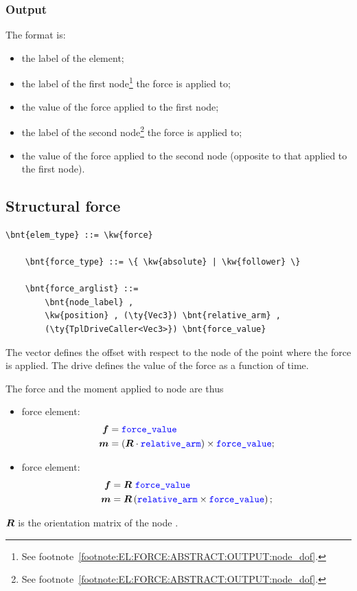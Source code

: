 \subsubsection{Output}
The format is:
\begin{itemize}
    \item the label of the element;
    \item the label of the first node\footnote{See
	footnote~\ref{footnote:EL:FORCE:ABSTRACT:OUTPUT:node_dof}.}
	the force is applied to;
    \item the value of the force applied to the first node;
    \item the label of the second node\footnote{See
	footnote~\ref{footnote:EL:FORCE:ABSTRACT:OUTPUT:node_dof}.}
	the force is applied to;
    \item the value of the force applied to the second node
	  (opposite to that applied to the first node).
\end{itemize}

\subsection{Structural force}
\label{sec:EL:FORCE:STRUCTURAL:FORCE}
\begin{Verbatim}[commandchars=\\\{\}]
    \bnt{elem_type} ::= \kw{force}

    \bnt{force_type} ::= \{ \kw{absolute} | \kw{follower} \} 

    \bnt{force_arglist} ::=
        \bnt{node_label} , 
        \kw{position} , (\ty{Vec3}) \bnt{relative_arm} ,
        (\ty{TplDriveCaller<Vec3>}) \bnt{force_value}
\end{Verbatim}
The vector  defines the offset with respect
to the node of the point where the force is applied.
The drive  defines the value of the force
as a function of time.

The force and the moment applied to node  are thus
\begin{itemize}
\item {} force element:
\begin{subequations}
\begin{align}
	\boldsymbol{f} & = \textcolor{blue}{\texttt{force\_value}} \\
	\boldsymbol{m} & = \left( \boldsymbol{R} \cdot \textcolor{blue}{\texttt{relative\_arm}} \right) \times \textcolor{blue}{\texttt{force\_value}} ;
\end{align}
\end{subequations}

\item {} force element:
\begin{subequations}
\begin{align}
	\boldsymbol{f} & = \boldsymbol{R} \ \textcolor{blue}{\texttt{force\_value}} \\
	\boldsymbol{m} & = \boldsymbol{R} \left( \textcolor{blue}{\texttt{relative\_arm}} \times \textcolor{blue}{\texttt{force\_value}} \right) ;
\end{align}
\end{subequations}
\end{itemize}
$\boldsymbol{R}$ is the orientation matrix of the node .

